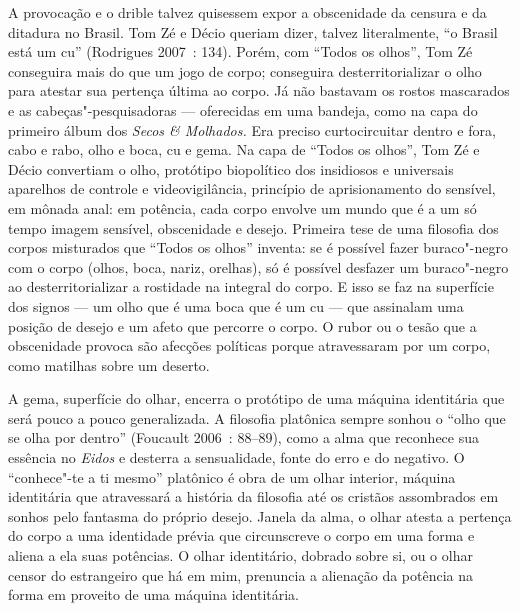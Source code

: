 A provocação e o drible talvez quisessem expor a obscenidade da censura
e da ditadura no Brasil. Tom Zé e Décio queriam dizer, talvez
literalmente, ``o Brasil está um cu'' (Rodrigues 2007~: 134). Porém, com
``Todos os olhos'', Tom Zé conseguira mais do que um jogo de
corpo; conseguira desterritorializar o olho para atestar sua pertença
última ao corpo. Já não bastavam os rostos mascarados e as
cabeças"-pesquisadoras --- oferecidas em uma bandeja, como na capa do
primeiro álbum dos \emph{Secos \& Molhados.} Era preciso curtocircuitar
dentro e fora, cabo e rabo, olho e boca, cu e gema. Na capa de ``Todos
os olhos'', Tom Zé e Décio convertiam o olho, protótipo biopolítico dos
insidiosos e universais aparelhos de controle e videovigilância,
princípio de aprisionamento do sensível, em mônada anal: em potência,
cada corpo envolve um mundo que é a um só tempo imagem sensível,
obscenidade e desejo. Primeira tese de uma filosofia dos corpos
misturados que ``Todos os olhos'' inventa: se é possível fazer
buraco"-negro com o corpo (olhos, boca, nariz, orelhas), só é possível
desfazer um buraco"-negro ao desterritorializar a rostidade na integral
do corpo. E isso se faz na superfície dos signos --- um olho que é uma
boca que é um cu --- que assinalam uma posição de desejo e um afeto que
percorre o corpo. O rubor ou o tesão que a obscenidade provoca são
afecções políticas porque atravessaram por um corpo, como matilhas sobre
um deserto.

A gema, superfície do olhar, encerra o protótipo de uma máquina
identitária que será pouco a pouco generalizada. A filosofia platônica
sempre sonhou o ``olho que se olha por dentro'' (Foucault 2006~: 88--89),
como a alma que reconhece sua essência no \emph{Eidos} e desterra a
sensualidade, fonte do erro e do negativo. O ``conhece"-te a ti mesmo''
platônico é obra de um olhar interior, máquina identitária que
atravessará a história da filosofia até os cristãos assombrados em
sonhos pelo fantasma do próprio desejo. Janela da alma, o olhar atesta a
pertença do corpo a uma identidade prévia que circunscreve o corpo em
uma forma e aliena a ela suas potências. O olhar identitário, dobrado
sobre si, ou o olhar censor do estrangeiro que há em mim, prenuncia a
alienação da potência na forma em proveito de uma máquina identitária.

